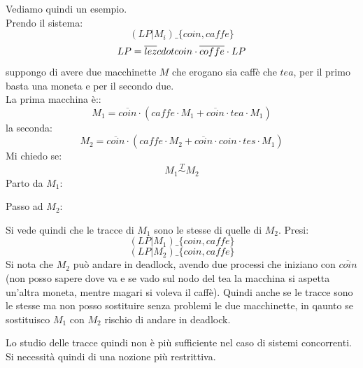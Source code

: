 \documentclass[a4paper,12pt, oneside]{book}
\begin{document}
\begin{esempio}
  Vediamo quindi un esempio.\\
  Prendo il sistema:
  \[(LP|M_i)\_{\{coin,caffe\}}\]
  \[LP=\overline{lez}\\cdot coin\cdot \overline{coffe}\cdot LP\]
  suppongo di avere due macchinette $M$ che erogano sia caffè che $tea$, per il
  primo basta una moneta e per il secondo due.\\
  La prima macchina è::
  \[M_1=\overline{coin}\cdot(caffe\cdot M_1+\overline{coin}\cdot tea\cdot M_1)\]
  la seconda:
  \[M_2=\overline{coin}\cdot(caffe\cdot M_2+\overline{coin}\cdot coin \cdot
    tes\cdot M_1)\]
  Mi chiedo se:
  \[M_1\stackrel{T}{\sim} M_2\]
  Parto da $M_1$:
  \begin{center}
  \end{center}
  Passo ad $M_2$:
   \begin{center}
  \end{center}
  Si vede quindi che le tracce di $M_1$ sono le stesse di quelle di $M_2$.
  Presi:
  \[(LP|M_1)\_{\{coin,caffe\}}\]
  \[(LP|M_2)\_{\{coin,caffe\}}\]
  Si nota che $M_2$ può andare in deadlock, avendo due processi che iniziano con
  $\overline{coin}$ (non posso sapere dove va e se vado sul nodo del tea la
  macchina si aspetta un'altra moneta, mentre magari si voleva il caffè). Quindi
  anche se le tracce sono le stesse ma non posso sostituire senza problemi le
  due macchinette, in qaunto se sostituisco $M_1$ con $M_2$ rischio di andare in
  deadlock.
  \label{coffe}
\end{esempio}
Lo studio delle tracce quindi non è più sufficiente nel caso di sistemi
concorrenti. Si necessità quindi di una nozione più restrittiva.
\end{document}
